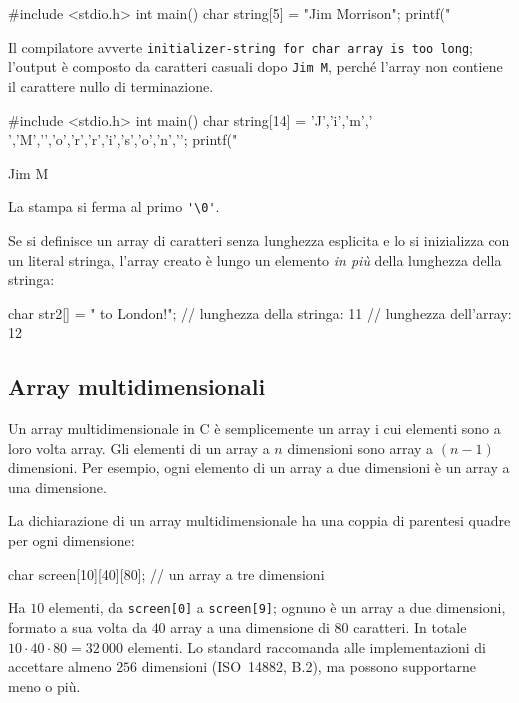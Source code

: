 \documentclass[11pt,a4paper]{article}
\begin{document}
\begin{esempio}
\begin{codice}
#include <stdio.h>
int main() {
    char string[5] = "Jim Morrison";
    printf("%
}
\end{codice}
Il compilatore avverte \texttt{initializer-string for char array is too long}; l'output è composto da caratteri casuali dopo \texttt{Jim M}, perché l'array non contiene il carattere nullo di terminazione.
\end{esempio}

\begin{esempio}
\begin{codice}
#include <stdio.h>
int main() {
    char string[14] = {'J','i','m',' ','M','\0','o','r','r','i','s','o','n','\0'};
    printf("%
}
\end{codice}
\begin{risultato}
Jim M
\end{risultato}
La stampa si ferma al primo \lstinline|'\0'|.
\end{esempio}

Se si definisce un array di caratteri senza lunghezza esplicita e lo si inizializza con un literal stringa, l'array creato è lungo un elemento \emph{in più} della lunghezza della stringa:
\begin{codice}
char str2[] = " to London!";   // lunghezza della stringa: 11
                               // lunghezza dell'array: 12
\end{codice}

\subsection{Array multidimensionali}

Un array multidimensionale in C è semplicemente un array i cui elementi sono a loro volta array. Gli elementi di un array a $n$ dimensioni sono array a $(n-1)$ dimensioni. Per esempio, ogni elemento di un array a due dimensioni è un array a una dimensione.

La dichiarazione di un array multidimensionale ha una coppia di parentesi quadre per ogni dimensione:
\begin{codice}
char screen[10][40][80];   // un array a tre dimensioni
\end{codice}
Ha $10$ elementi, da \lstinline|screen[0]| a \lstinline|screen[9]|; ognuno è un array a due dimensioni, formato a sua volta da $40$ array a una dimensione di $80$ caratteri. In totale $10\cdot 40 \cdot 80 = 32\,000$ elementi. Lo standard raccomanda alle implementazioni di accettare almeno $256$ dimensioni (ISO~14882, B.2), ma possono supportarne meno o più.
\end{document}
